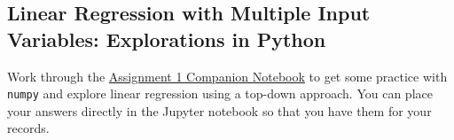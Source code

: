 \documentclass[assignment01_Solutions]{subfiles}
\begin{document}
\subsection{Linear Regression with Multiple Input Variables: Explorations in Python}
\begin{externalresources}[(90 minutes)]
Work through the \href{https://colab.research.google.com/drive/12pLbQkhrPoI-22FVV6gZNObi1IJCW-mF}{Assignment 1 Companion Notebook} to get some practice with {\tt numpy} and explore linear regression using a top-down approach.  You can place your answers directly in the Jupyter notebook so that you have them for your records.

\end{externalresources}
\end{document}
